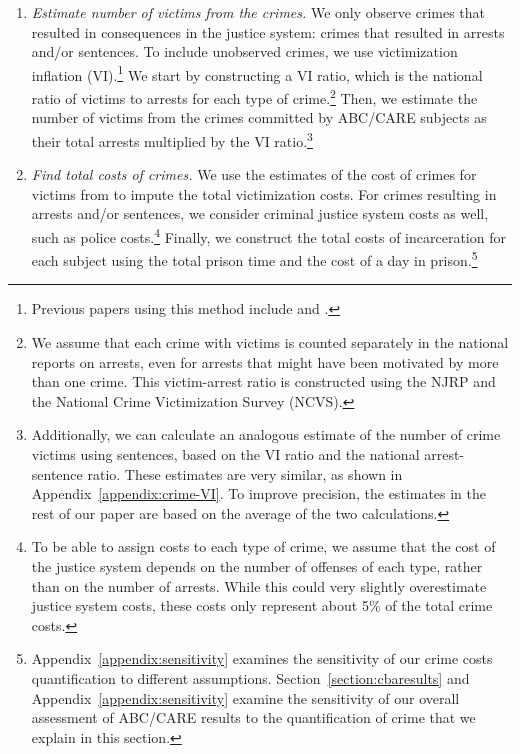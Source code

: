\begin{enumerate}
\item \textit{Estimate number of victims from the crimes.} We only observe crimes that resulted in consequences in the justice system: crimes that resulted in arrests and/or sentences. To include unobserved crimes, we use victimization inflation (VI).\footnote{Previous papers using this method include \citet{Belfield_Nores_etal_2006_JHR} and \cite{Heckman_Moon_etal_2010_RateofReturn}.} We start by constructing a VI ratio, which is the national ratio of victims to arrests for each type of crime.\footnote{We assume that each crime with victims is counted separately in the national reports on arrests, even for arrests that might have been motivated by more than one crime. This victim-arrest ratio is constructed using the NJRP and the National Crime Victimization Survey (NCVS).} Then, we estimate the number of victims from the crimes committed by ABC/CARE subjects as their total arrests multiplied by the VI ratio.\footnote{Additionally, we can calculate an analogous estimate of the number of crime victims using sentences, based on the VI ratio and the national arrest-sentence ratio. These estimates are very similar, as shown in Appendix~\ref{appendix:crime-VI}. To improve precision, the estimates in the rest of our paper are based on the average of the two calculations.}

\item \textit{Find total costs of crimes.} We use the estimates of the cost of crimes for victims from \cite{McCollister_etal_2010_DAD} to impute the total victimization costs. For crimes resulting in arrests and/or sentences, we consider criminal justice system costs as well, such as police costs.\footnote{To be able to assign costs to each type of crime, we assume that the cost of the justice system depends on the number of offenses of each type, rather than on the number of arrests. While this could very slightly overestimate justice system costs, these costs only represent about 5\% of the total crime costs.} Finally, we construct the total costs of incarceration for each subject using the total prison time and the cost of a day in prison.\footnote{ Appendix~\ref{appendix:sensitivity} examines the sensitivity of our crime costs quantification to different assumptions. Section~\ref{section:cbaresults} and  Appendix~\ref{appendix:sensitivity} examine the sensitivity of our overall assessment of ABC/CARE results to the quantification of crime that we explain in this section.}
\end{enumerate}

